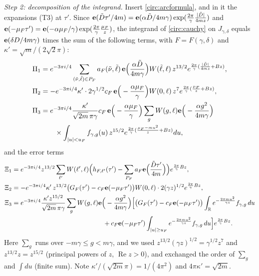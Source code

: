 \emph{Step 2: decomposition of the integrand.} Insert \eqref{circ:arcformula}, and in it the expansions (T3) at $\tau'$. Since $\mathbf e(\tilde D\tau'/4m)=\mathbf e(\alpha\tilde D/4m\gamma)\exp(\frac{2\pi}\gamma\frac{|\tilde D|}{4mz})$ and $\mathbf e(-\mu_F\tau')=\mathbf e(-\alpha\mu_F/\gamma)\exp(\frac{2\pi}\gamma\frac{\mu_F}z)$, the integrand of \eqref{circ:cauchy} on $J_{\gamma,\delta}$ equals $\mathbf e(\delta D/4m\gamma)$ times the sum of the following terms, with $F=F(\gamma,\delta)$ and $\kappa'=\sqrt m/(2\sqrt2\pi)$:
\begin{align*}
\Pi_1&=e^{-3\pi i/4}\sum_{(\tilde\nu,\tilde\ell)\in P_F}a_F(\tilde\nu,\tilde\ell)\,\mathbf e\Big(\frac{\alpha\tilde D}{4m\gamma}\Big)W(\tilde\ell,\ell)\,z^{13/2}e^{\frac{2\pi}\gamma(\frac{|\tilde D|}{4mz}+Bz)},\\
\Pi_2&=-e^{-3\pi i/4}\kappa'\cdot2\gamma^{1/2}c_F\,\mathbf e\Big(-\frac{\alpha\mu_F}\gamma\Big)W(0,\ell)\,z^{7}e^{\frac{2\pi}\gamma(\frac{\mu_F}z+Bz)},\\
\Pi_3&=e^{-3\pi i/4}\frac{\kappa'}{\sqrt{2m}\,\pi\gamma}c_F\,\mathbf e\Big(-\frac{\alpha\mu_F}\gamma\Big)\sum_gW(g,\ell)\mathbf e\Big(-\frac{\alpha g^2}{4m\gamma}\Big)\\
&\qquad\times\int_{|u|<u_F}f_{\gamma,g}(u)\,z^{15/2}e^{\frac{2\pi}\gamma(\frac{\mu_F-mu^2}z+Bz)}du,
\end{align*}
and the error terms
\begin{align*}
\Xi_1&=e^{-3\pi i/4}z^{13/2}\sum_{\ell'}W(\ell',\ell)\Big(h_{F,\ell'}(\tau')-\sum_{P_F}a_F\e\Big(\frac{\tilde D\tau'}{4m}\Big)\Big)e^{\frac{2\pi}\gamma Bz},\\
\Xi_2&=-e^{-3\pi i/4}\kappa'\,z^{13/2}\big(G_F(\tau')-c_F\e(-\mu_F\tau')\big)W(0,\ell)\cdot2(\gamma z)^{1/2}e^{\frac{2\pi}\gamma Bz},\\
\Xi_3&=e^{-3\pi i/4}\frac{\kappa'z^{15/2}}{\sqrt{2m}\,\pi\gamma}\sum_gW(g,\ell)\e\Big(-\frac{\alpha g^2}{4m\gamma}\Big)\Big[\big(G_F(\tau')-c_F\e(-\mu_F\tau')\big)\int_\RR e^{-\frac{2\pi mu^2}{\gamma z}}f_{\gamma,g}\,du\\
&\hspace{14em}+c_F\e(-\mu_F\tau')\int_{|u|\ge u_F}e^{-\frac{2\pi mu^2}{\gamma z}}f_{\gamma,g}\,du\Big]e^{\frac{2\pi}\gamma Bz}.
\end{align*}
Here $\sum_g$ runs over $-m\gamma\le g<m\gamma$, and we used $z^{13/2}(\gamma z)^{1/2}=\gamma^{1/2}z^7$ and $z^{13/2}z=z^{15/2}$ (principal powers of $z$, $\operatorname{Re}z>0$), and exchanged the order of $\sum_g$ and $\int du$ (finite sum). Note $\kappa'/(\sqrt{2m}\pi)=1/(4\pi^2)$ and $4\pi\kappa'=\sqrt{2m}$.

